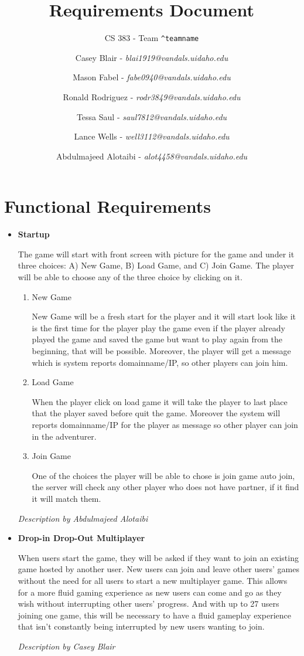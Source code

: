 \documentclass[12pt]{article}
\title{Requirements Document}
\subtitle{CS 383 - Team \texttt{\textasciicircum teamname}}
\author{
Casey Blair - \textit{blai1919@vandals.uidaho.edu} \\
\and Mason Fabel - \textit{fabe0940@vandals.uidaho.edu} \\
\and Ronald Rodriguez - \textit{rodr3849@vandals.uidaho.edu} \\
\and Tessa Saul - \textit{saul7812@vandals.uidaho.edu} \\
\and Lance Wells - \textit{well3112@vandals.uidaho.edu} \\
\and Abdulmajeed Alotaibi - \textit{alot4458@vandals.uidaho.edu} \\
}
\begin{document}
\maketitle

\section{Functional Requirements}
\begin{itemize}
	\item \textbf{Startup}
	
	The game will start with front screen with picture for the game and under
	it three choices: A) New Game, B) Load Game, and C) Join Game. The player
	will be able to choose any of the three choice by clicking on it.

	\begin{enumerate}
	\item New Game

	New Game will be a fresh start for the player and it will start look like
	it is the first time for the player play the game even if the player
	already played the game and saved the game but want to play again from the
	beginning, that will be possible. Moreover, the player will get a message
	which is system reports domainname/IP, so other players can join him.

	\item Load Game

	When the player click on load game it will take the player to last place
	that the player saved before quit the game. Moreover the system will
	reports domainname/IP for the player as message so other player can join in
	the adventurer.

	\item Join Game

	One of the choices the player will be able to chose is join game auto join,
	the server will check any other player who does not have partner, if it
	find it will match them.
	\end{enumerate}
	
	\emph{Description by Abdulmajeed Alotaibi}
	
	\item \textbf{Drop-in Drop-Out Multiplayer}
	
	 When users start the game, they will be asked if they want to join an existing game hosted by another user. New users can join and leave other users’ games without the need for all users to start a new multiplayer game. This allows
for a more fluid gaming experience as new users can come and go as they wish without interrupting other users’ progress. And with up to 27 users joining one game, this will be necessary to have a fluid gameplay experience that isn’t constantly being interrupted by new users wanting to
join.

\emph{Description by Casey Blair}
\end{itemize}
\end{document}
